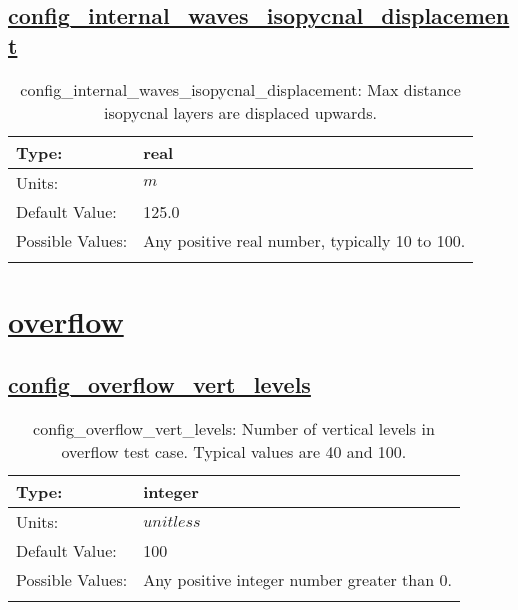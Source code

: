 \subsection[config\_internal\_waves\_isopycnal\_displacement]{\hyperref[sec:nm_tab_internal_waves]{config\_internal\_waves\_isopycnal\_displacement}}
\label{subsec:nm_sec_config_internal_waves_isopycnal_displacement}
\begin{center}
\begin{longtable}{| p{2.0in} || p{4.0in} |}
    \hline
    Type: & real \\
    \hline
    Units: & $m$ \\
    \hline
    Default Value: & 125.0 \\
    \hline
    Possible Values: & Any positive real number, typically 10 to 100. \\
    \hline
    \caption{config\_internal\_waves\_isopycnal\_displacement: Max distance isopycnal layers are displaced upwards.}
\end{longtable}
\end{center}
\section[overflow]{\hyperref[sec:nm_tab_overflow]{overflow}}
\label{sec:nm_sec_overflow}
\subsection[config\_overflow\_vert\_levels]{\hyperref[sec:nm_tab_overflow]{config\_overflow\_vert\_levels}}
\label{subsec:nm_sec_config_overflow_vert_levels}
\begin{center}
\begin{longtable}{| p{2.0in} || p{4.0in} |}
    \hline
    Type: & integer \\
    \hline
    Units: & $unitless$ \\
    \hline
    Default Value: & 100 \\
    \hline
    Possible Values: & Any positive integer number greater than 0. \\
    \hline
    \caption{config\_overflow\_vert\_levels: Number of vertical levels in overflow test case. Typical values are 40 and 100.}
\end{longtable}
\end{center}
